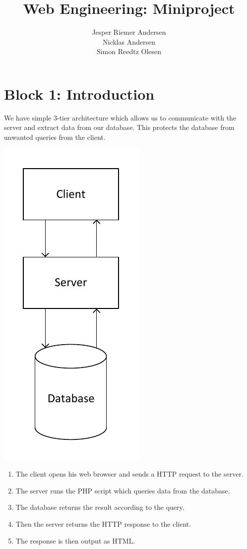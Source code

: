 \documentclass[a4paper,12pt]{article}
\title{Web Engineering: Miniproject}
\author{Jesper Riemer Andersen\\Nicklas Andersen\\Simon Reedtz Olesen}
\begin{document}
\maketitle

\section{Block 1: Introduction}
We have simple 3-tier architecture which allows us to communicate with the server and extract data from our database. This protects the database from unwanted queries from the client.

\begin{center}
\includegraphics[scale=0.8]{3-tier.pdf}
\end{center}

\begin{enumerate}
\item The client opens his web browser and sends a HTTP request to the server.
\item The server runs the PHP script which queries data from the database.
\item The database returns the result according to the query.
\item Then the server returns the HTTP response to the client.
\item The response is then output as HTML.
\end{enumerate}
\end{document}
